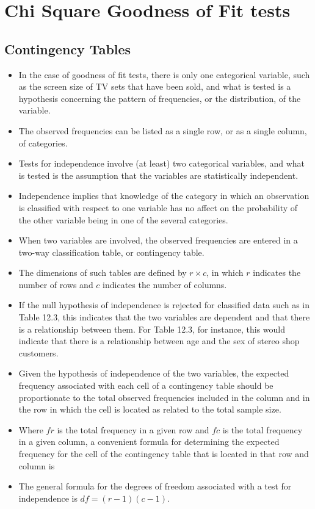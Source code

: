 \documentclass[]{report}
\begin{document}
	
	
\chapter{Chi Square Goodness of Fit tests}
\section{Contingency Tables}
\begin{itemize}
\item In the case of goodness of fit tests, there is only one
categorical variable, such as the screen size of TV sets that have
been sold, and what is tested is a hypothesis concerning the
pattern of frequencies, or the distribution, of the variable.

\item The observed frequencies can be listed as a single row, or as a
single column, of categories.
\item 
Tests for independence involve (at least) two categorical
variables, and what is tested is the assumption that the variables
are statistically independent.
\item 
Independence implies that knowledge of the category in which an
observation is classified with respect to one variable has no
affect on the probability of the other variable being in one of
the several categories.

\item When two variables are involved, the observed frequencies are
entered in a two-way classification table, or contingency table.

\item The dimensions of such tables are defined by $r \times c$, in
which $r$ indicates the number of rows and $c$ indicates the
number of columns.
\item 
If the null hypothesis of independence is rejected for classified
data such as in Table 12.3, this indicates that the two variables
are dependent and that there is a relationship between them. For
Table 12.3, for instance, this would indicate that there is a
relationship between age and the sex of stereo shop customers.

\item Given the hypothesis of independence of the two variables, the
expected frequency associated with each cell of a contingency
table should be proportionate to the total observed frequencies
included in the column and in the row in which the cell is located
as related to the total sample size.

\item Where $fr$ is the total frequency in a given row and $fc$ is the
total frequency in a given column, a convenient formula for
determining the expected frequency for the cell of the contingency
table that is located in that row and column is

\item The general formula for the degrees of freedom associated with a
test for independence is $df = (r - 1)(c - 1)$.

\end{itemize}
\end{document}
